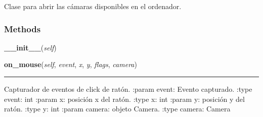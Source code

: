     \label{src:cameras:Cameras}
Clase para abrir las cámaras disponibles en el ordenador.



  \subsubsection{Methods}

    \label{src:cameras:Cameras:__init__}

    \vspace{0.5ex}

\hspace{.8\funcindent}\begin{boxedminipage}{\funcwidth}

    \raggedright \textbf{\_\_init\_\_}(\textit{self})

\setlength{\parskip}{2ex}
\setlength{\parskip}{1ex}
    \end{boxedminipage}

    \label{src:cameras:Cameras:on_mouse}

    \vspace{0.5ex}

\hspace{.8\funcindent}\begin{boxedminipage}{\funcwidth}

    \raggedright \textbf{on\_mouse}(\textit{self}, \textit{event}, \textit{x}, \textit{y}, \textit{flags}, \textit{camera})

    \vspace{-1.5ex}

    \rule{\textwidth}{0.5\fboxrule}
\setlength{\parskip}{2ex}
    Capturador de eventos de click de ratón. :param event: Evento 
    capturado. :type event: int :param x: posición x del ratón. :type x: 
    int :param y: posición y del ratón. :type y: int :param camera: objeto 
    Camera. :type camera: Camera

\setlength{\parskip}{1ex}
    \end{boxedminipage}

